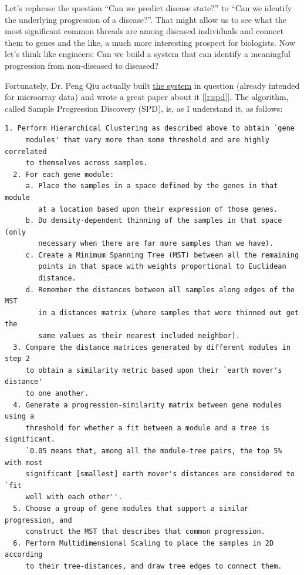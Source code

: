 \documentclass[]{article}
\begin{document}
  Let's rephrase the question ``Can we predict disease state?'' to ``Can we identify the underlying progression of a disease?''. That might allow us to see what the most significant common threads are among diseased individuals and connect them to genes and the like, a much more interesting prospect for biologists. Now let's think like engineers: Can we build a system that can identify a meaningful progression from non-diseased to diseased?

  Fortunately, Dr. Peng Qiu actually built \href{http://pengqiu.gatech.edu/software/SPD/index.html}{the system} in question (already intended for microarray data) and wrote a great paper about it [\ref{r:spd}]. The algorithm, called Sample Progression Discovery (SPD), is, as I understand it, as follows:

  \begin{lstlisting}[mathescape]
  1. Perform Hierarchical Clustering as described above to obtain `gene
     modules' that vary more than some threshold and are highly correlated
     to themselves across samples.
  2. For each gene module:
     a. Place the samples in a space defined by the genes in that module
        at a location based upon their expression of those genes.
     b. Do density-dependent thinning of the samples in that space (only
        necessary when there are far more samples than we have).
     c. Create a Minimum Spanning Tree (MST) between all the remaining
        points in that space with weights proportional to Euclidean
        distance.
     d. Remember the distances between all samples along edges of the MST
        in a distances matrix (where samples that were thinned out get the
        same values as their nearest included neighbor).
  3. Compare the distance matrices generated by different modules in step 2
     to obtain a similarity metric based upon their `earth mover's distance'
     to one another.
  4. Generate a progression-similarity matrix between gene modules using a
     threshold for whether a fit between a module and a tree is significant.
     `0.05 means that, among all the module-tree pairs, the top 5% with most
     significant [smallest] earth mover's distances are considered to `fit
     well with each other''.
  5. Choose a group of gene modules that support a similar progression, and
     construct the MST that describes that common progression.
  6. Perform Multidimensional Scaling to place the samples in 2D according
     to their tree-distances, and draw tree edges to connect them.
  \end{lstlisting}
\end{document}
